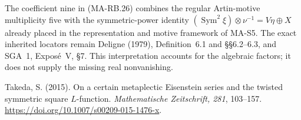 The coefficient nine in (MA-RB.26) combines the
regular Artin-motive multiplicity five with the
symmetric-power identity
\((\operatorname{Sym}^2\xi)\otimes\nu^{-1}
=V\eta\oplus X\) already placed in the representation
and motive framework of MA-S5.
The exact inherited locators remain Deligne (1979),
Definition~6.1 and \S\S6.2--6.3, and SGA~1,
Expos\'e~V, \S7.
This interpretation accounts for the algebraic factors;
it does not supply the missing real nonvanishing.

Takeda, S. (2015). On a certain metaplectic Eisenstein series
and the twisted symmetric square \(L\)-function.
\emph{Mathematische Zeitschrift, 281}, 103--157.
\url{https://doi.org/10.1007/s00209-015-1476-x}.
